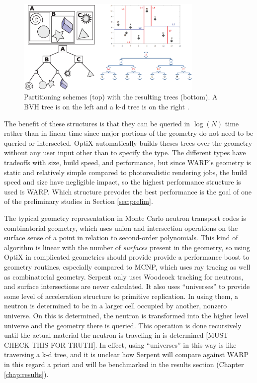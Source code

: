 \begin{figure}[h!] 
\centering
\includegraphics[width=0.8\textwidth, trim= 8cm 0cm 0cm 0cm ]{graphics/bvh_kd.eps}
\caption{Partitioning schemes (top) with the resulting trees (bottom). A BVH tree \cite{wikimedia_bvh} is on the left and a k-d tree is on the right \cite{wikimedia_kd}.   \label{bvh_kd}}
\end{figure}

The benefit of these structures is that they can be queried in $\log(N)$ time rather than in linear time since major portions of the geometry do not need to be queried or intersected.  OptiX automatically builds theses trees over the geometry without any user input other than to specify the type.  The different types have tradeoffs with size, build speed, and performance, but since WARP's geometry is static and relatively simple compared to photorealistic rendering jobs, the build speed and size have negligible impact, so the highest performance structure is used is WARP.  Which structure prevodes the best performance is the goal of one of the preliminary studies in Section \ref{sec:prelim}.  

The typical geometry representation in Monte Carlo neutron transport codes is combinatorial geometry, which uses union and intersection operations on the surface sense  of a point in relation to second-order polynomials.  This kind of algorithm is linear with the number of \emph{surfaces} present in the geometry, so using OptiX in complicated geometries should provide provide a performance boost to geometry routines, especially compared to MCNP, which uses ray tracing as well as combinatorial geometry.  Serpent only uses Woodcock tracking for neutrons, and surface intersections are never calculated.  It also uses ``universes'' to provide some level of acceleration structure to primitive replication.  In using them, a neutron is determined to be in a larger cell occupied by another, nonzero universe.  On this is determined, the neutron is transformed into the higher level universe and the geometry there is queried.  This operation is done recursively until the actual material the neutron is traveling in is determined \cite{jaakko}[MUST CHECK THIS FOR TRUTH].  In effect, using ``universes'' in this way is like traversing a k-d tree, and it is unclear how Serpent will compare against WARP in this regard a priori and will be benchmarked in the results section (Chapter \ref{chap:results}).

